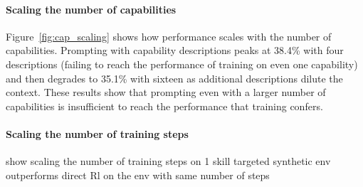\paragraph{Scaling the number of capabilities}
Figure~\ref{fig:cap_scaling} shows how performance scales with the number of capabilities. Prompting with capability descriptions peaks at 38.4\% with four descriptions (failing to reach the performance of training on even one capability) and then degrades to 35.1\% with sixteen as additional descriptions dilute the context. These results show that prompting even with a larger number of capabilities is insufficient to reach the performance that training confers.



\paragraph{Scaling the number of training steps}

show scaling the number of training steps on 1 skill targeted synthetic env outperforms direct Rl on the env with same number of steps
